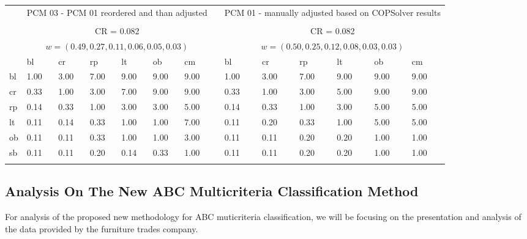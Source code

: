 \documentclass[10pt,fleqn,a4paper,twoside]{article}
\begin{document}
\begin{table}[ht]
\begin{center}
\begin{tabular}[l]{p{0.4cm} p{0.5cm} p{0.5cm} p{0.5cm} p{0.5cm} p{0.5cm} p{0.5cm} p{0.1cm} | p{0.5cm} p{0.5cm} p{0.5cm} p{0.5cm} p{0.5cm} p{0.5cm}}
						& \multicolumn{6}{l}{PCM 03 - PCM 01 reordered and than adjusted} & & \multicolumn{6}{l}{PCM 01 - manually adjusted based on COPSolver results} \\
						\cline {1-14} \\
  						& \multicolumn{6}{c}{CR = 0.082}  & & \multicolumn{6}{c}{CR = 0.082} \\
  						& \multicolumn{6}{c}{$w=(0.49, 0.27, 0.11, 0.06, 0.05, 0.03)$} & & \multicolumn{6}{c}{$w = (0.50, 0.25, 0.12, 0.08, 0.03, 0.03)$} \\
   						& bl & cr & rp & lt & ob & cm & & bl & cr & rp & lt & ob & cm \\        
						bl & 1.00 & 3.00 & 7.00 & 9.00 & 9.00 & 9.00 & & 1.00 & 3.00 & 7.00 & 9.00 & 9.00 & 9.00 \\
						cr & 0.33 & 1.00 & 3.00 & 7.00 & 9.00 & 9.00 & & 0.33 & 1.00 & 3.00 & \cellcolor[HTML]{ACE600} 5.00 & 9.00 & 9.00 \\
						rp & 0.14 & 0.33 & 1.00 & \cellcolor[HTML]{ACE600} 3.00 & 3.00 & 5.00 & & 0.14 & 0.33 & 1.00 & \cellcolor[HTML]{ACE600} 3.00 & \cellcolor[HTML]{ACE600} 5.00 & 5.00 \\
						lt & 0.11 & 0.14 & \cellcolor[HTML]{ACE600} 0.33 & 1.00 & \cellcolor[HTML]{ACE600} 1.00 & 7.00 & & 0.11 & \cellcolor[HTML]{ACE600} 0.20 & \cellcolor[HTML]{ACE600} 0.33 & 1.00 & 5.00 & \cellcolor[HTML]{ACE600} 5.00 \\
						ob & 0.11 & 0.11 & 0.33 & \cellcolor[HTML]{ACE600} 1.00 & 1.00 & \cellcolor[HTML]{ACE600} 3.00 & & 0.11 & 0.11 & \cellcolor[HTML]{ACE600}  0.20 & 0.20 & 1.00 & 1.00 \\
						sb & 0.11 & 0.11 & 0.20 & 0.14 & \cellcolor[HTML]{ACE600} 0.33 & 1.00 & & 0.11 & 0.11 & 0.20 & \cellcolor[HTML]{ACE600} 0.20 & 1.00 & 1.00 \\
						\cline {1-14} \\
				\end{tabular} \label{tab:pairwiseMatrixAdjusted}
            \end{center}
	\end{table}

\subsection{Analysis On The New ABC Multicriteria Classification Method}

For analysis of the proposed new methodology for ABC muticriteria classification, we will be focusing on the presentation and analysis of the data provided by the furniture trades company. 
\end{document}
